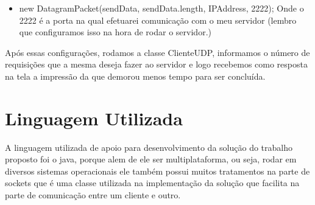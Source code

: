 \documentclass{abnt}
\begin{document}
		\begin{itemize}
				\item new DatagramPacket(sendData, sendData.length, IPAddress, 2222); Onde o 2222 é a porta na qual efetuarei comunicação com o meu servidor (lembro que configuramos isso na hora de rodar o servidor.)
				\end{itemize}	
	
	Após essas configurações, rodamos a classe ClienteUDP, informamos o número de requisições que a mesma deseja fazer ao servidor e logo recebemos como resposta na tela a impressão da que demorou menos tempo para ser concluída.
	
	\section{Linguagem Utilizada}	
		A linguagem utilizada de apoio para desenvolvimento da solução do trabalho proposto foi o java, porque alem de ele ser multiplataforma, ou seja, rodar em diversos sistemas operacionais ele também possui muitos tratamentos na parte de sockets que é uma classe utilizada na implementação da solução que facilita na parte de comunicação entre um cliente e outro. \cite{ORACLE}
		
	



\clearpage
\nocite{*}
		
	
	
\end{document}
